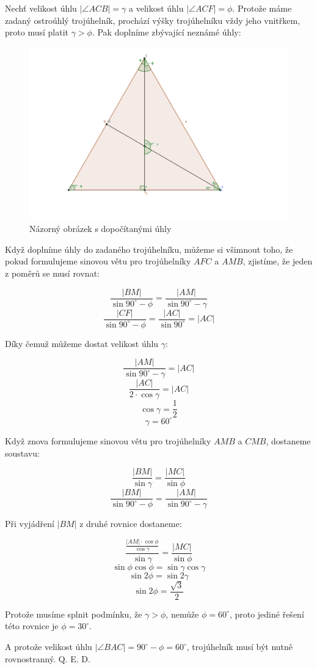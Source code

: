 \documentclass{fkssolpub}
\author{Ondřej Sedláček}
\begin{document}
 

Nechť velikost úhlu $|\angle ACB| = \gamma$ a velikost úhlu $|\angle ACF| = \phi$.
Protože máme zadaný ostroúhlý trojúhelník, prochází výšky trojúhelníku vždy jeho
vnitřkem, proto musí platit $\gamma > \phi$. Pak doplníme zbývající neznámé
úhly:

\begin{figure}[h!]
  \includegraphics[width=\textwidth]{7-fig.png}
  \caption{Názorný obrázek s dopočítanými úhly}
  \label{fig:1}
\end{figure}

Když doplníme úhly do zadaného trojúhelníku, můžeme si všimnout toho, že pokud
formulujeme sinovou větu pro trojúhelníky $AFC$ a $AMB$, zjistíme, že jeden z poměrů
se musí rovnat:

\[
  \frac{|BM|}{\sin 90^{\circ} - \phi} = \frac{|AM|}{\sin 90^{\circ} - \gamma}
\]
\[
  \frac{|CF|}{\sin 90^{\circ} - \phi} = \frac{|AC|}{\sin 90^{\circ}} = |AC|
\]

Díky čemuž můžeme dostat velikost úhlu $\gamma$:

\[
  \frac{|AM|}{\sin 90^{\circ} - \gamma} = |AC|
\]
\[
  \frac{|AC|}{2 \cdot \cos \gamma} = |AC|
\]
\[
  \cos \gamma = \frac{1}{2}
\]
\[
  \gamma = 60^{\circ}
\]

Když znova formulujeme sinovou větu pro trojúhelníky $AMB$ a $CMB$, dostaneme
soustavu:

\[
  \frac{|BM|}{\sin \gamma} = \frac{|MC|}{\sin \phi}
\]
\[
  \frac{|BM|}{\sin 90^{\circ} - \phi} = \frac{|AM|}{\sin 90^{\circ} - \gamma}
\]

Při vyjádření $|BM|$ z druhé rovnice dostaneme:

\[
  \frac{\frac{|AM| \cdot \cos \phi}{\cos \gamma}}{\sin \gamma} = \frac{|MC|}{\sin \phi}
\]
\[
  \sin \phi \cos \phi = \sin \gamma \cos \gamma
\]
\[
  \sin 2 \phi = \sin 2 \gamma
\]
\[
  \sin 2 \phi = \frac{\sqrt{3}}{2}
\]

Protože musíme splnit podmínku, že $\gamma > \phi$, nemůže $\phi = 60^{\circ}$, proto
jediné řešení této rovnice je $\phi = 30^{\circ}$. 

A protože velikost úhlu $|\angle BAC| = 90^{\circ} - \phi = 60^{\circ}$, trojúhelník
musí být nutně rovnostranný. Q. E. D.
\end{document}
